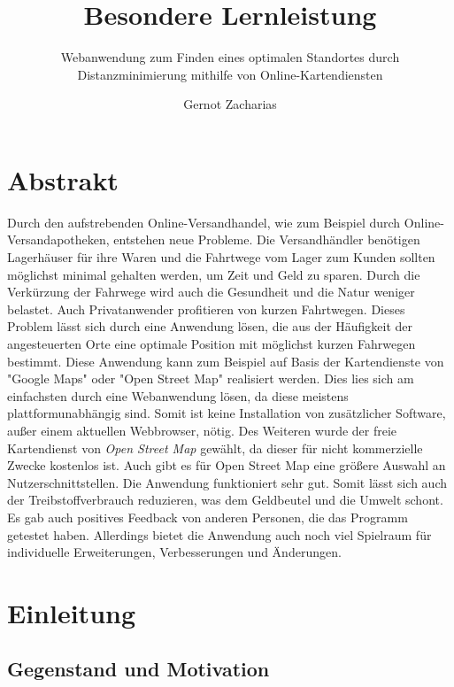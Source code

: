 \documentclass[a4paper, 12pt]{scrreprt}
\title{Besondere Lernleistung}
\author{Gernot Zacharias}
\subtitle{Webanwendung zum Finden eines optimalen Standortes durch Distanzminimierung mithilfe von Online-Kartendiensten}
\begin{document}
\maketitle
\cleardoublepage
\chapter*{Abstrakt}
Durch den aufstrebenden Online-Versandhandel, wie zum Beispiel durch Online-Versandapotheken, entstehen neue Probleme.
Die Versandhändler benötigen Lagerhäuser für ihre Waren und die Fahrtwege vom Lager zum Kunden sollten möglichst minimal gehalten werden, um Zeit und Geld zu sparen.
Durch die Verkürzung der Fahrwege wird auch die Gesundheit und die Natur weniger belastet.
Auch Privatanwender profitieren von kurzen Fahrtwegen.
Dieses Problem lässt sich durch eine Anwendung lösen, die aus der Häufigkeit der angesteuerten Orte eine optimale Position mit möglichst kurzen Fahrwegen bestimmt.
Diese Anwendung kann zum Beispiel auf Basis der Kartendienste von "Google Maps" oder "Open Street Map" realisiert werden.
Dies lies sich am einfachsten durch eine Webanwendung lösen, da diese meistens plattformunabhängig sind.
Somit ist keine Installation von zusätzlicher Software, außer einem aktuellen Webbrowser, nötig.
Des Weiteren wurde der freie Kartendienst von \emph{Open Street Map} gewählt, da dieser für nicht kommerzielle Zwecke kostenlos ist.
Auch gibt es für Open Street Map eine größere Auswahl an Nutzerschnittstellen.
Die Anwendung funktioniert sehr gut.%
Somit lässt sich auch der Treibstoffverbrauch reduzieren, was dem Geldbeutel und die Umwelt schont.
Es gab auch positives Feedback von anderen Personen, die das Programm getestet haben.
Allerdings bietet die Anwendung auch noch viel Spielraum für individuelle Erweiterungen, Verbesserungen und Änderungen.
\tableofcontents

\chapter{Einleitung}
\setcounter{page}{1}
\section{Gegenstand und Motivation}
\end{document}
